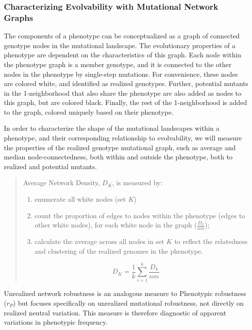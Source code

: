\subsubsection{Characterizing Evolvability with Mutational Network Graphs}

The components of a phenotype can be conceptualized as a graph of connected genotype nodes in the mutational landscape. The evolutionary properties of a phenotype are dependent on the characteristics of this graph.  Each node within the phenotype graph is a member genotype, and it is connected to the other nodes in the phenotype by single-step mutations. For convenience, these nodes are colored white, and identified as realized genotypes. Further, potential mutants in the 1-neighborhood that also share the phenotype are also added as nodes to this graph, but are colored black. Finally, the rest of the 1-neighborhood is added to the graph, colored uniquely based on their phenotype. 

In order to characterize the shape of the mutational landscapes within a phenotype, and their corresponding relationship to evolvability, we will measure the properties of the realized genotype mutational graph, such as average and median node-connectedness, both within and outside the phenotype, both to realized and potential mutants. 

\begin{quote}

Average Network Density, $D_K$, is measured by:

\begin{enumerate}
\item enumerate all white nodes (set $K$)
\item count the proportion of edges to nodes within the phenotype (edges to other white nodes), for each white node in the graph ($\frac{D_k}{nm}$);
\item calculate the average across all nodes in set $K$ to reflect the relatedness and clustering of the realized genomes in the phenotype.
\end{enumerate}

\begin{equation}
D_{K} =  {\frac{1}{k} \sum_{i=1}^{k}}\frac{D_k}{nm} 
\end{equation}

\end{quote}

Unrealized network robustness is an analogous measure to Phenotypic robustness ($r_P$) but focuses specifically on unrealized mutational robustness, not directly on realized neutral variation. This measure is therefore diagnostic of apparent variations in phenotypic frequency. 

